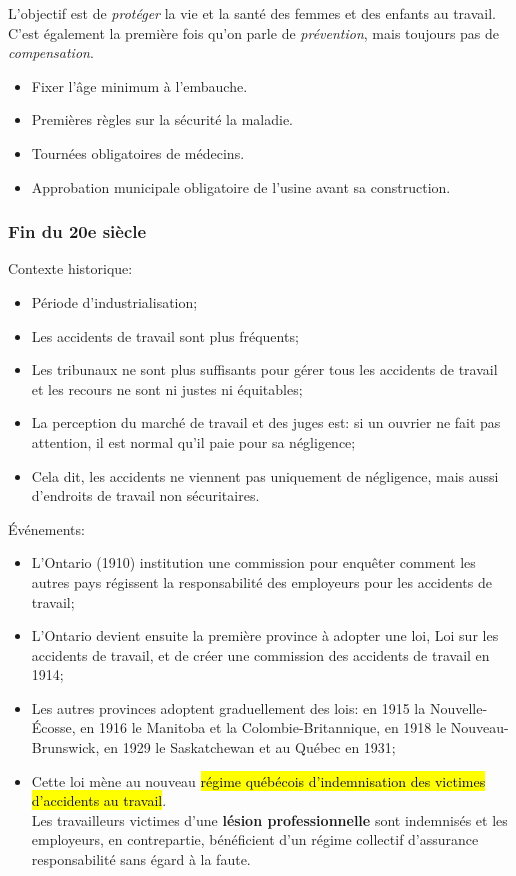 \documentclass[10pt, french]{article}
\begin{document}
\begin{multicols*}{3}
\begin{rappel_enhanced}
L’objectif est de \textit{protéger} la vie et la santé des femmes et des enfants au travail. C'est également la première fois qu'on parle de \textit{prévention}, mais toujours pas de \textit{compensation}.
\begin{itemize}[leftmargin = *]
	\item	Fixer l'âge minimum à l'embauche.
	\item	Premières règles sur la sécurité la maladie.
	\item	Tournées obligatoires de médecins.
	\item	Approbation municipale obligatoire de l'usine avant sa construction.
\end{itemize}
\end{rappel_enhanced}

\subsubsection*{Fin du 20e siècle}

Contexte historique:
\begin{itemize}[leftmargin = *]
	\item	Période d'industrialisation;
	\item	Les accidents de travail sont plus fréquents;
	\item	Les tribunaux ne sont plus suffisants pour gérer tous les accidents de travail et les recours ne sont ni justes ni équitables;
	\item	La perception du marché de travail et des juges est: si un ouvrier ne fait pas attention, il est normal qu'il paie pour sa négligence;
	\item	Cela dit, les accidents ne viennent pas uniquement de négligence, mais aussi d'endroits de travail non sécuritaires.
\end{itemize}

Événements:
\begin{itemize}[leftmargin = *]
	\item	L'Ontario (1910) institution une commission pour enquêter comment les autres pays régissent la responsabilité des employeurs pour les accidents de travail;
	\item	L'Ontario devient ensuite la première province à adopter une loi, Loi sur les accidents de travail, et de créer une commission des accidents de travail en 1914;
	\item	Les autres provinces adoptent graduellement des lois: en 1915 la Nouvelle-Écosse, en 1916 le Manitoba et la Colombie-Britannique, en 1918 le Nouveau-Brunswick, en 1929 le Saskatchewan et au Québec en 1931;
	\item	Cette loi mène au nouveau \hl{régime québécois d'indemnisation des victimes d'accidents au travail}.	\\
			Les travailleurs victimes d'une \textbf{lésion professionnelle} sont indemnisés et les employeurs, en contrepartie, bénéficient d'un régime collectif d'assurance responsabilité sans égard à la faute.
\end{itemize}


\end{multicols*}
\end{document}
